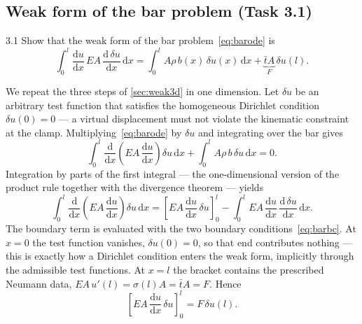\documentclass[11pt,a4paper]{article}
\numberwithin{equation}{section}
\theoremstyle{remark}
\begin{document}
\subsection{Weak form of the bar problem (Task 3.1)}\label{sec:weakbar}

\begin{task}{3.1}
  Show that the weak form of the bar problem~\eqref{eq:barode} is
  \begin{equation*}
    \int_0^l \frac{\mathrm{d}u}{\mathrm{d}x}\,EA\,\frac{\mathrm{d}\,\delta u}{\mathrm{d}x}\,\mathrm{d}x
    = \int_0^l A\rho\,b(x)\,\delta u(x)\,\mathrm{d}x + \underbrace{\bar{t}A}_{F}\,\delta u(l).
  \end{equation*}
\end{task}

We repeat the three steps of \cref{sec:weak3d} in one dimension. Let $\delta u$ be an
arbitrary test function that satisfies the homogeneous Dirichlet condition
$\delta u(0) = 0$ --- a virtual displacement must not violate the kinematic constraint at
the clamp. Multiplying~\eqref{eq:barode} by $\delta u$ and integrating over the bar gives
\begin{equation}\label{eq:weak1}
  \int_0^l \frac{\mathrm{d}}{\mathrm{d}x}\!\left(EA\,\frac{\mathrm{d}u}{\mathrm{d}x}\right)\delta u \,\mathrm{d}x
  + \int_0^l A\rho\,b\,\delta u \,\mathrm{d}x = 0.
\end{equation}
Integration by parts of the first integral --- the one-dimensional version of the product
rule together with the divergence theorem --- yields
\begin{equation}\label{eq:weak2}
  \int_0^l \frac{\mathrm{d}}{\mathrm{d}x}\!\left(EA\,\frac{\mathrm{d}u}{\mathrm{d}x}\right)\delta u \,\mathrm{d}x
  = \left[EA\,\frac{\mathrm{d}u}{\mathrm{d}x}\,\delta u\right]_0^l
  - \int_0^l EA\,\frac{\mathrm{d}u}{\mathrm{d}x}\,\frac{\mathrm{d}\,\delta u}{\mathrm{d}x}\,\mathrm{d}x .
\end{equation}
The boundary term is evaluated with the two boundary conditions~\eqref{eq:barbc}. At
$x = 0$ the test function vanishes, $\delta u(0) = 0$, so that end contributes nothing ---
this is exactly how a Dirichlet condition enters the weak form, implicitly through the
admissible test functions. At $x = l$ the bracket contains the prescribed Neumann data,
$EA\,u'(l) = \sigma(l)A = \bar{t}A = F$. Hence
\begin{equation}\label{eq:weak3}
  \left[EA\,\frac{\mathrm{d}u}{\mathrm{d}x}\,\delta u\right]_0^l = F\,\delta u(l).
\end{equation}
\end{document}

